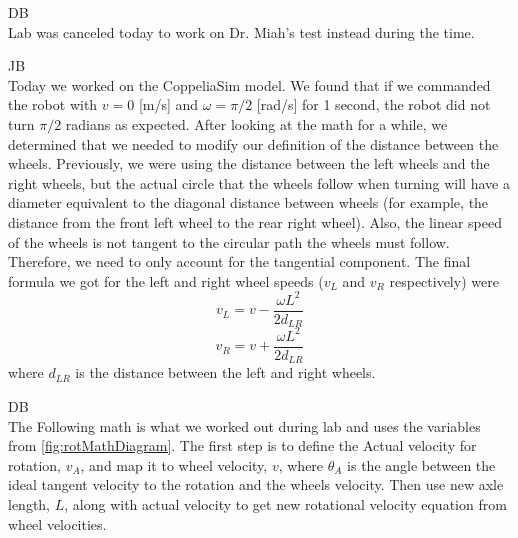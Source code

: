 \documentclass[fontsize=11pt, %
                             paper=letter, %
                             openany, %
                             captions=tableheading,
                             index=totoc,
                             hyperref]{labbook}
\begin{document}
\begin{addmargin}[0cm]{0cm}

DB\\
Lab was canceled today to work on Dr. Miah's test instead during the time.


JB\\
Today we worked on the CoppeliaSim model. We found that if we commanded the robot with $v = 0$ [m/s] and $\omega = \pi/2$ [rad/s] for 1 second, the robot did not turn $\pi/2$ radians as expected. After looking at the math for a while, we determined that we needed to modify our definition of the distance between the wheels. Previously, we were using the distance between the left wheels and the right wheels, but the actual circle that the wheels follow when turning will have a diameter equivalent to the diagonal distance between wheels (for example, the distance from the front left wheel to the rear right wheel). Also, the linear speed of the wheels is not tangent to the circular path the wheels must follow. Therefore, we need to only account for the tangential component. The final formula we got for the left and right wheel speeds ($v_L$ and $v_R$ respectively) were
$$v_L = v - \frac{\omega L^2}{2d_{LR}}$$
$$v_R = v + \frac{\omega L^2}{2d_{LR}}$$
where $d_{LR}$ is the distance between the left and right wheels.

\vspace*{12pt}DB\\
The Following math is what we worked out during lab and uses the variables from \autoref{fig:rotMathDiagram}. The first step is to define the Actual velocity for rotation, $v_A$, and map it to wheel velocity, $v$, where $\theta_A$ is the angle between the ideal tangent velocity to the rotation and the wheels velocity.  Then use new axle length, $L$, along with actual velocity to get new rotational velocity equation from wheel velocities.


\end{addmargin}
\end{document}
